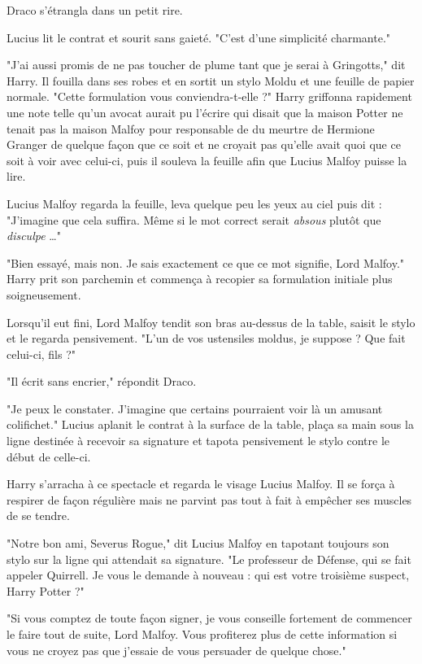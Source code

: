 Draco s'étrangla dans un petit rire.

Lucius lit le contrat et sourit sans gaieté. "C'est d'une simplicité charmante."

"J'ai aussi promis de ne pas toucher de plume tant que je serai à Gringotts," dit Harry. Il fouilla dans ses robes et en sortit un stylo Moldu et une feuille de papier normale. "Cette formulation vous conviendra-t-elle ?" Harry griffonna rapidement une note telle qu'un avocat aurait pu l'écrire qui disait que la maison Potter ne tenait pas la maison Malfoy pour responsable de du meurtre de Hermione Granger de quelque façon que ce soit et ne croyait pas qu'elle avait quoi que ce soit à voir avec celui-ci, puis il souleva la feuille afin que Lucius Malfoy puisse la lire.

Lucius Malfoy regarda la feuille, leva quelque peu les yeux au ciel puis dit : "J'imagine que cela suffira. Même si le mot correct serait \emph{absous}  plutôt que \emph{disculpe} …"

"Bien essayé, mais non. Je sais exactement ce que ce mot signifie, Lord Malfoy." Harry prit son parchemin et commença à recopier sa formulation initiale plus soigneusement.

Lorsqu'il eut fini, Lord Malfoy tendit son bras au-dessus de la table, saisit le stylo et le regarda pensivement. "L'un de vos ustensiles moldus, je suppose ? Que fait celui-ci, fils ?"

"Il écrit sans encrier," répondit Draco.

"Je peux le constater. J'imagine que certains pourraient voir là un amusant colifichet." Lucius aplanit le contrat à la surface de la table, plaça sa main sous la ligne destinée à recevoir sa signature et tapota pensivement le stylo contre le début de celle-ci.

Harry s'arracha à ce spectacle et regarda le visage Lucius Malfoy. Il se força à respirer de façon régulière mais ne parvint pas tout à fait à empêcher ses muscles de se tendre.

"Notre bon ami, Severus Rogue," dit Lucius Malfoy en tapotant toujours son stylo sur la ligne qui attendait sa signature. "Le professeur de Défense, qui se fait appeler Quirrell. Je vous le demande à nouveau : qui est votre troisième suspect, Harry Potter ?"

"Si vous comptez de toute façon signer, je vous conseille fortement de commencer le faire tout de suite, Lord Malfoy. Vous profiterez plus de cette information si vous ne croyez pas que j'essaie de vous persuader de quelque chose."

